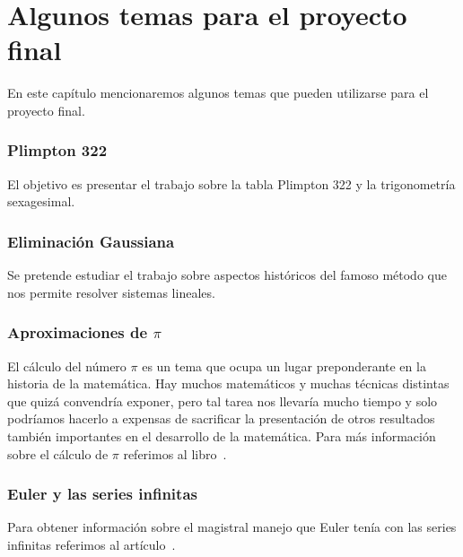 \chapter{Algunos temas para el proyecto final}

\pagestyle{plain}
\fancyhf{}
\fancyfoot[CE,CO]{\leftmark}
\fancyfoot[LE,RO]{\thepage}


En este capítulo mencionaremos algunos temas
que pueden utilizarse para el proyecto final. 

\subsection*{Plimpton 322}

El objetivo es presentar el trabajo \cite{MR3716328} sobre la tabla Plimpton 322 y
la trigonometría sexagesimal. 

\subsection*{Eliminación Gaussiana}

Se pretende estudiar el trabajo \cite{MR2775854} sobre aspectos históricos del famoso 
método que nos permite 
resolver sistemas lineales.

\subsection*{Aproximaciones de $\pi$}

El cálculo del número $\pi$ es un tema que ocupa un lugar preponderante en la
historia de la matemática. Hay muchos matemáticos y muchas técnicas distintas
que quizá convendría exponer, pero tal tarea nos llevaría mucho tiempo y solo
podríamos hacerlo a expensas de sacrificar la presentación de otros resultados
también importantes en el desarrollo de la matemática. Para más información
sobre el cálculo de $\pi$ referimos al libro~\cite{MR0449960}. 

\subsection*{Euler y las series infinitas}

Para obtener información sobre el magistral manejo que Euler tenía con las series
infinitas referimos al artículo~\cite{MR2338363}.

